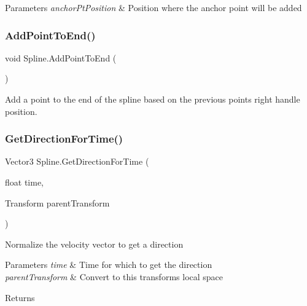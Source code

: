 \begin{DoxyParams}{Parameters}
{\em anchor\+Pt\+Position} & Position where the anchor point will be added\\
\hline
\end{DoxyParams}
\mbox{\label{class_spline_ad6d6a6bf25678d717d1f01fcf44fd237}} 
\subsubsection{\texorpdfstring{Add\+Point\+To\+End()}{AddPointToEnd()}}
{\footnotesize\ttfamily void Spline.\+Add\+Point\+To\+End (\begin{DoxyParamCaption}{ }\end{DoxyParamCaption})}



Add a point to the end of the spline based on the previous point\textquotesingle{}s right handle position. 

\mbox{\label{class_spline_a6747581a7cb4cc9f59eaa751c326c909}} 
\subsubsection{\texorpdfstring{Get\+Direction\+For\+Time()}{GetDirectionForTime()}}
{\footnotesize\ttfamily Vector3 Spline.\+Get\+Direction\+For\+Time (\begin{DoxyParamCaption}\item[{float}]{time,  }\item[{Transform}]{parent\+Transform }\end{DoxyParamCaption})}



Normalize the velocity vector to get a direction 


\begin{DoxyParams}{Parameters}
{\em time} & Time for which to get the direction\\
\hline
{\em parent\+Transform} & Convert to this transform\textquotesingle{}s local space \\
\hline
\end{DoxyParams}
\begin{DoxyReturn}{Returns}

\end{DoxyReturn}
\mbox{\label{class_spline_ad64325ef2a69decba37df63869d994e9}} 
